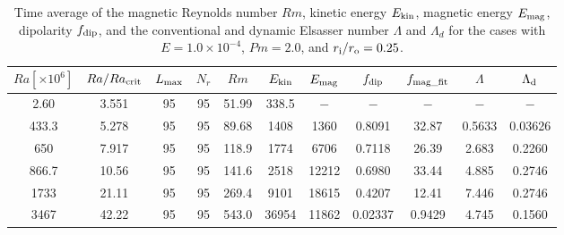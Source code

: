 \begin{table}
{\color{red}
\caption{Time average of the magnetic Reynolds number $Rm$, kinetic energy $E_{\rm kin}$, magnetic energy $E_{\rm mag}$, dipolarity $f_{\rm dip}$, and  the conventional and dynamic Elsasser number $\Lambda$ and $\Lambda_{d}$ for the cases with $E = 1.0 \times 10^{-4}$, $Pm = 2.0$, and $r_{\rm i}/r_{\rm o} = 0.25$.}
}
{\color{red}
  \begin{tabular}{ccccccccccc}
    \hline
     $Ra[\times 10^6]$  &  $Ra/Ra_{\rm crit}$& 
     $L_{\rm max}$ & $N_{r}$ & $Rm$ 
     & $E_{\rm kin}$  &  $E_{\rm mag}$ & $f_{\rm dip}$ & $f_{\rm mag\_fit}$ & $\Lambda$ & $\Lambda_{\rm d}$\\
    \hline
      2.60 & 3.551 & 95 & 95 & 51.99 & 338.5 & $-$ & $-$ & $-$ & $-$ & $-$ \\
      433.3 & 5.278 & 95 & 95 & 89.68 & 1408 & 1360 & 0.8091 & 32.87 & 0.5633 & 0.03626 \\
      650 & 7.917 & 95 & 95 & 118.9 & 1774 & 6706 & 0.7118 & 26.39 & 2.683 & 0.2260 \\
      866.7 & 10.56 & 95 & 95 & 141.6 & 2518 & 12212 & 0.6980 & 33.44 & 4.885 & 0.2746 \\
      1733 & 21.11 & 95 & 95 & 269.4 & 9101 & 18615 & 0.4207 & 12.41 & 7.446 & 0.2746 \\
      3467 & 42.22 & 95 & 95 & 543.0 & 36954 & 11862 & 0.02337 & 0.9429 & 4.745 & 0.1560 \\
    \hline
  \end{tabular}
 }
\label{table:Summary_25_Ek4}
\end{table}
%
%
